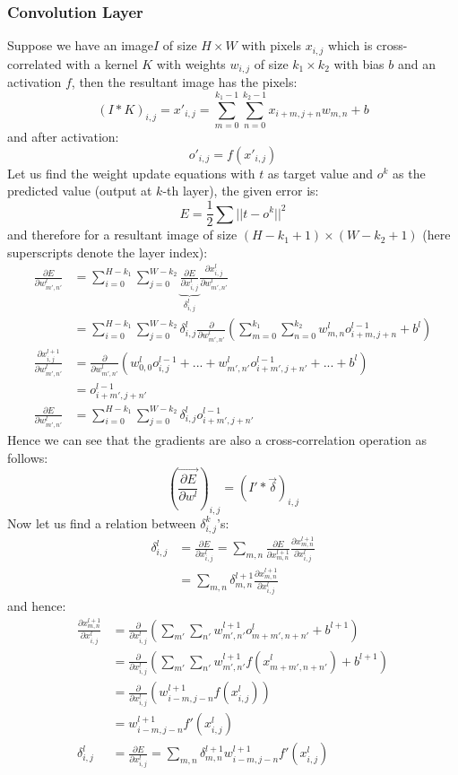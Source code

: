 \documentclass{article}
\begin{document}
\subsubsection{Convolution Layer}
Suppose we have an image$I$ of size $H\times W$ with pixels $x_{i,j}$ which is cross-correlated with a kernel $K$ with weights $w_{i,j}$ of size $k_1\times k_2$ with bias $b$ and an activation $f$, then the resultant image has the pixels:
$$(I*K)_{i,j}=x'_{i,j}=\sum_{m=0}^{k_1-1}\sum_{n=0}^{k_2-1}x_{i+m,j+n}w_{m,n}+b$$
and after activation:
$$o'_{i,j}=f(x'_{i,j})$$
Let us find the weight update equations with $t$ as target value and $o^k$ as the predicted value (output at $k$-th layer), the given error is:
$$E=\frac 12\sum ||t-o^k||^2$$
and therefore for a resultant image of size $(H-k_1+1)\times(W-k_2+1)$ (here superscripts denote the layer index):
\begin{align*}
\frac{\partial E}{\partial w_{m',n'}^l} &= \sum_{i=0}^{H-k_1}\sum_{j=0}^{W-k_2}\underbrace{\frac {\partial E}{\partial x_{i,j}^{l}}}_{\delta_{i,j}^{l}}\frac{\partial x_{i,j}^{l}}{\partial w_{m',n'}^l}\\
&= \sum_{i=0}^{H-k_1}\sum_{j=0}^{W-k_2}\delta_{i,j}^{l}\frac{\partial}{\partial w_{m',n'}^l}\left(\sum_{m=0}^{k_1}\sum_{n=0}^{k_2} w_{m,n}^lo_{i+m,j+n}^{l-1}+b^l\right)\\
\frac{\partial x_{i,j}^{l+1}}{\partial w_{m',n'}^l}&=\frac{\partial}{\partial w_{m',n'}^l}\left(w_{0,0}^lo_{i,j}^{l-1}+...+w_{m',n'}^lo_{i+m',j+n'}^{l-1}+...+b^l\right)\\
&=o_{i+m',j+n'}^{l-1}\\
\frac{\partial E}{\partial w_{m',n'}^l}&=\sum_{i=0}^{H-k_1}\sum_{j=0}^{W-k_2}\delta_{i,j}^{l}o_{i+m',j+n'}^{l-1}
\end{align*}
Hence we can see that the gradients are also a cross-correlation operation as follows:
$$\left(\overrightarrow{\frac{\partial E}{\partial w^l}}\right)_{i,j}=(I'*\vec \delta)_{i,j}$$
Now let us find a relation between $\delta_{i,j}^k$'s:
\begin{align*}
\delta_{i,j}^l&=\frac{\partial E}{\partial x_{i,j}^l}=\sum_{m,n}\frac{\partial E}{\partial x_{m,n}^{l+1}}\frac{\partial x_{m,n}^{l+1}}{\partial x_{i,j}^l}\\
&=\sum_{m,n}\delta_{m,n}^{l+1}\frac{\partial x_{m,n}^{l+1}}{\partial x_{i,j}^l}
\end{align*}
and hence:
\begin{align*}
\frac{\partial x_{m,n}^{l+1}}{\partial x_{i,j}^l}&=\frac{\partial }{\partial x_{i,j}^l}\left(\sum_{m'}\sum_{n'}w_{m',n'}^{l+1}o_{m+m',n+n'}^l+b^{l+1}\right)\\
&=\frac{\partial }{\partial x_{i,j}^l}\left(\sum_{m'}\sum_{n'}w_{m',n'}^{l+1}f(x_{m+m',n+n'}^l)+b^{l+1}\right)\\
&=\frac{\partial }{\partial x_{i,j}^l}\left(w_{i-m,j-n}^{l+1}f(x_{i,j}^l)\right)\\
&=w_{i-m,j-n}^{l+1}f'(x_{i,j}^l)\\
\delta_{i,j}^l&=\frac{\partial E}{\partial x_{i,j}^l}=\sum_{m,n}\delta_{m,n}^{l+1}w_{i-m,j-n}^{l+1}f'(x_{i,j}^l)
\end{align*}
\end{document}
